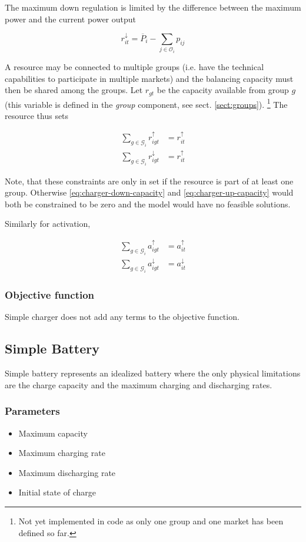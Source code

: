 \documentclass[]{report}
\newcommand{\groups}{\mathcal{G}}
\newcommand{\outputs}{\mathcal{O}}
\newcommand{\pmax}{\overline{P}}
\newcommand{\socmax}{\overline{Q}}
\newcommand{\pdmax}{\overline{P}^\mathrm{D}}
\newcommand{\pcmax}{\overline{P}^\mathrm{C}}
\newcommand{\aup}{a^{\uparrow}}
\newcommand{\adown}{a^{\downarrow}}
\newcommand{\rup}{r^{\uparrow}}
\newcommand{\rdown}{r^{\downarrow}}
\begin{document}
The maximum down regulation is limited by the difference between the maximum power and the current power output

\begin{equation}
    \label{eq:charger-down-capacity}
    r^{\downarrow}_{it} = \pmax_i - \sum_{j \in \outputs_i} p_{ij}
\end{equation}

A resource may be connected to multiple groups (i.e. have the technical capabilities to participate in multiple markets) and the balancing capacity must then be shared among the groups. Let $r_{gt}$ be the capacity available from group $g$ (this variable is defined in the \textit{group} component, see sect. \ref{sect:groups}).
\footnote{Not yet implemented in code as only one group and one market has been defined so far.}%
The resource thus sets

\begin{align}
    \sum_{g \in \groups_i} \rup_{igt} &= \rup_{it} \\
    \sum_{g \in \groups_i} \rdown_{igt} &= \rup_{it}
\end{align}

Note, that these constraints are only in set if the resource is part of at least one group. Otherwise \ref{eq:charger-down-capacity} and \ref{eq:charger-up-capacity} would both be constrained to be zero and the model would have no feasible solutions.

Similarly for activation,

\begin{align}
    \sum_{g \in \groups_i} \aup_{igt} &= \aup_{it} \\
    \sum_{g \in \groups_i} \adown_{igt} &= \adown_{it}
\end{align}

\subsubsection*{Objective function}
Simple charger does not add any terms to the objective function. 

\subsection{Simple Battery}
Simple battery represents an idealized battery where the only physical limitations are the charge capacity and the maximum charging and discharging rates.

\subsubsection*{Parameters}
\begin{itemize}
    \item [$\socmax$] Maximum capacity
    \item [$\pcmax$] Maximum charging rate
    \item [$\pdmax$] Maximum discharging rate
    \item [$Q_0$] Initial state of charge 
\end{itemize}
\end{document}
